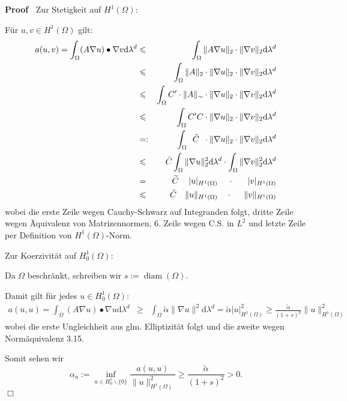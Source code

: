 \documentclass{book}
\newcommand{\assign}{:=}
\newcommand{\mathd}{\mathrm{d}}
\newcommand{\tmop}[1]{\ensuremath{\operatorname{#1}}}
\newenvironment{proof}{\noindent\textbf{Proof\ }}{\hspace*{\fill}$\Box$\medskip}
\begin{document}
\begin{proof}
  Zur Stetigkeit auf $H^1 (\Omega)$:
  
  F{\"u}r $u, v \in H^1 (\Omega)$ gilt:
  \begin{eqnarray*}
    a (u, v) = \int_{\Omega} (A \nabla u) \bullet \nabla v \mathd \lambda^d &
    \leqslant & \int_{\Omega} \| A \nabla u \|_2 \cdot \| \nabla v \|_2 \mathd
    \lambda^d\\
    & \leqslant & \int_{\Omega} \| A \|_2 \cdot \| \nabla u \|_2 \cdot \|
    \nabla v \|_2 \mathd \lambda^d\\
    & \leqslant & \int_{\Omega} C' \cdot {\| A \|_{\sim}}  \cdot \| \nabla u
    \|_2 \cdot \| \nabla v \|_2 \mathd \lambda^d\\
    & \leqslant & \int_{\Omega} C' C  \cdot \| \nabla u \|_2 \cdot \| \nabla
    v \|_2 \mathd \lambda^d\\
    & = : & \int_{\Omega} \text{\enspace} \tilde{C} \enspace  \cdot \| \nabla
    u \|_2 \cdot \| \nabla v \|_2 \mathd \lambda^d\\
    & \leqslant & \tilde{C} \int_{\Omega} \| \nabla u \|^2_2 \mathd \lambda^d
    \cdot \int_{\Omega} \| \nabla v \|^2_2 \mathd \lambda^d\\
    & = & \widetilde{C} \text{{\hspace{1.2em}}} | u |_{H^1 (\Omega)}
    \hspace{1.2em} \cdot \text{{\hspace{1.65em}}} | v |_{H^1 (\Omega)}\\
    & \leqslant & \tilde{C} \quad \| u \|_{H^1 (\Omega)} \quad \cdot
    \text{{\hspace{1.4em}}} \| v \|_{H^1 (\Omega)}
  \end{eqnarray*}
  wobei die erste Zeile wegen Cauchy-Schwarz auf Integranden folgt, dritte
  Zeile wegen {\"A}quivalenz von Matrizennormen, 6. Zeile wegen C.S. in $L^2$
  und letzte Zeile per Definition von $H^1 (\Omega)$-Norm.
  
  \qquad Zur Koerzivit{\"a}t auf $H^1_0 (\Omega)$:
  
  Da $\Omega$ beschr{\"a}nkt, schreiben wir $s \assign \tmop{diam} (\Omega)$.
  
  Damit gilt f{\"u}r jedes $u \in H^1_0 (\Omega)$:
  \begin{eqnarray*}
    a (u, u) = \int_{\Omega} (A \nabla u) \bullet \nabla u \mathd \lambda^d &
    \geqslant & \int_{\Omega} \tilde{\alpha} \| \nabla u \|^2 \mathd \lambda^d
    = \tilde{\alpha} | u |^2_{H^1 (\Omega)} \geqslant \frac{\tilde{\alpha}}{(1
    + s)^2} \| u \|^2_{H^1 (\Omega)}
  \end{eqnarray*}
  wobei die erste Ungleichheit aus glm. Elliptizit{\"a}t folgt und die zweite
  wegen Norm{\"a}quivalenz 3.15.
  
  Somit sehen wir
  \[ \alpha_a \assign \inf_{u \in H^1_0 \backslash \{ 0 \}} \frac{a (u,
     u)}{\| u \|^2_{H^1 (\Omega)}} \geqslant \frac{\tilde{\alpha}}{(1 + s)^2}
     > 0. \]
\end{proof}
\end{document}
